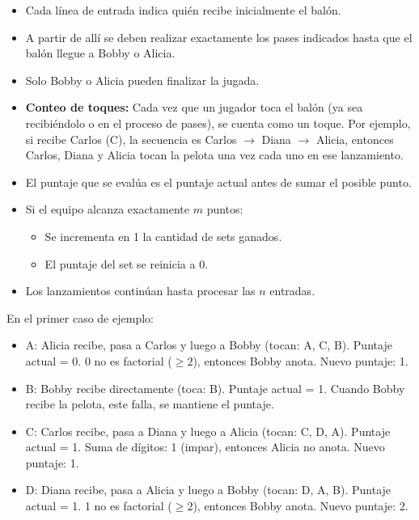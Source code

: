 \documentclass[11pt,a4paper]{article}
\begin{document}
\begin{itemize}
  \item Cada línea de entrada indica quién recibe inicialmente el balón.
  \item A partir de allí se deben realizar exactamente los pases indicados
        hasta que el balón llegue a Bobby o Alicia.
  \item Solo Bobby o Alicia pueden finalizar la jugada.
  \item \textbf{Conteo de toques:} Cada vez que un jugador toca el balón (ya sea
        recibiéndolo o en el proceso de pases), se cuenta como un toque. Por ejemplo,
        si recibe Carlos (C), la secuencia es Carlos $\to$ Diana $\to$ Alicia,
        entonces Carlos, Diana y Alicia tocan la pelota una vez cada uno en ese lanzamiento.
  \item El puntaje que se evalúa es el puntaje actual antes de sumar el posible punto.
  \item Si el equipo alcanza exactamente $m$ puntos:
        \begin{itemize}
            \item Se incrementa en 1 la cantidad de sets ganados.
            \item El puntaje del set se reinicia a 0.
        \end{itemize}
  \item Los lanzamientos continúan hasta procesar las $n$ entradas.
\end{itemize}

En el primer caso de ejemplo:

\begin{itemize}
  \item A: Alicia recibe, pasa a Carlos y luego a Bobby (tocan: A, C, B).
        Puntaje actual = 0.
        0 no es factorial (\(\geq 2\)), entonces Bobby anota.
        Nuevo puntaje: 1.
  \item B: Bobby recibe directamente (toca: B).
        Puntaje actual = 1. Cuando Bobby recibe la pelota, este falla, se mantiene el puntaje.
  \item C: Carlos recibe, pasa a Diana y luego a Alicia (tocan: C, D, A).
        Puntaje actual = 1.
        Suma de dígitos: 1 (impar), entonces Alicia no anota.
        Nuevo puntaje: 1.
  \item D: Diana recibe, pasa a Alicia y luego a Bobby (tocan: D, A, B).
        Puntaje actual = 1.
        1 no es factorial (\(\geq 2\)), entonces Bobby anota.
        Nuevo puntaje: 2.
\end{itemize}
\end{document}
